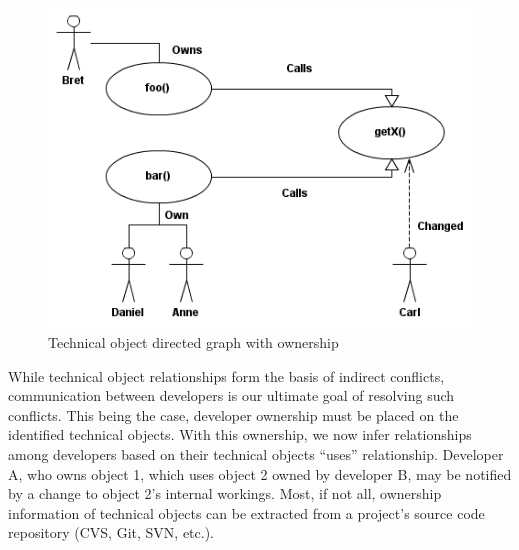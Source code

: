 \documentclass[conference]{IEEEtran}
\begin{document}
\begin{figure}[t!]
\includegraphics[width=\columnwidth]{images/CallGraph}
\caption{Technical object directed graph with ownership\label{fig:graph}}
\end{figure}

While technical object relationships form the basis of indirect conflicts,
communication between developers is our ultimate goal of resolving such conflicts.
This being the case, developer ownership must be placed on the 
identified technical objects. With this ownership, we now infer
relationships among developers based on their technical objects
``uses'' relationship. Developer A, who owns object 1, which uses 
object 2 owned by developer B, may be notified by a change to
object 2's internal workings. Most, if not all, ownership information
of technical objects can be extracted from a project's source code
repository (CVS, Git, SVN, etc.).
\end{document}
